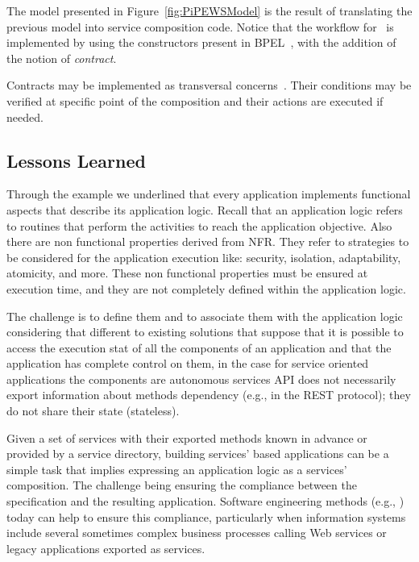 The model presented in Figure~\ref{fig:PiPEWSModel} is the result of translating the previous model into service composition code.
Notice that the workflow for \FlyingPig\ is implemented by using the constructors present in BPEL~\cite{BPEL}, with the addition of the notion of \textit{contract}.

Contracts may be implemented as transversal concerns~\cite{aspects}.
Their conditions may be verified at specific point of the composition and their actions are executed if needed.

\subsection{Lessons Learned}

Through the example we underlined that every application implements functional aspects that describe its application logic.
Recall that an application logic refers to routines that perform the activities to reach the application objective.
Also there are non functional properties derived from NFR. They refer to strategies to be considered for the application execution like: security, isolation, adaptability, atomicity, and more.
These non functional properties must be ensured at execution time, and they are not completely defined within the application logic.

The challenge is to define them and to associate them with the application logic considering that different to existing solutions that suppose that it is possible to access the execution stat of all the components  of an application and that the application has complete control on them, in the case for service oriented applications  the components are autonomous services
API does not necessarily export information about methods dependency (e.g., in the REST protocol);
they do not share their state (stateless).

Given a set of services with their exported methods known in advance or provided by a  service directory, building services' based applications can be  a simple task that implies expressing an application logic as a services' composition. The challenge being  ensuring the compliance between the specification and the resulting application. Software engineering methods (e.g., \cite{1,2,decastro1,PapazoglouH06}) today can help to ensure this compliance, particularly when information systems include several sometimes complex business processes calling Web services or legacy applications exported as services.
